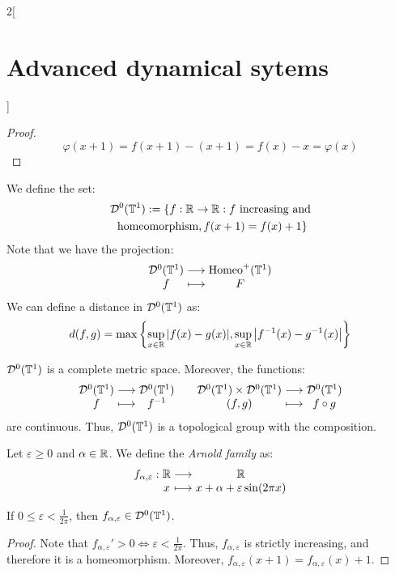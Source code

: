 \documentclass[../../../main_math.tex]{subfiles}
\begin{document}
\begin{multicols}{2}[\section{Advanced dynamical sytems}]
\begin{proof}
    $$
      \varphi(x+1)=f(x+1)-(x+1)=f(x)-x=\varphi(x)
    $$
  \end{proof}
  \begin{definition}
    We define the set:
    \begin{multline*}
      \mathcal{D}^0(\mathbb{T}^1):=\{f:\mathbb{R}\to\mathbb{R}:f\text{ increasing and}\\
      \text{ homeomorphism}, f(x+1)=f(x)+1\}
    \end{multline*}
    Note that we have the projection:
    $$
      \function{}{\mathcal{D}^0(\TT^1)}{\Homeoplus(\TT^1)}{f}{F}
    $$
    We can define a distance in $\mathcal{D}^0(\mathbb{T}^1)$ as:
    $$
      d(f,g)=\max\left\{ \sup_{x\in\mathbb{R}}\abs{f(x)-g(x)},\sup_{x\in\mathbb{R}}\abs{f^{-1}(x)-g^{-1}(x)}\right\}
    $$
  \end{definition}
  \begin{lemma}
    $\mathcal{D}^0(\mathbb{T}^1)$ is a complete metric space. Moreover, the functions:
    $$
      \function{}{\mathcal{D}^0(\TT^1)}{\mathcal{D}^0(\TT^1)}{f}{f^{-1}}\quad
      \function{}{\mathcal{D}^0(\TT^1)\times \mathcal{D}^0(\TT^1)}{\mathcal{D}^0(\TT^1)}{(f,g)}{f\circ g}
    $$
    are continuous.
    Thus, $\mathcal{D}^0(\mathbb{T}^1)$ is a topological group with the composition.
  \end{lemma}
  \begin{definition}
    Let $\varepsilon\geq 0$ and $\alpha\in\mathbb{R}$. We define the \emph{Arnold family} as:
    $$
      \function{f_{\alpha,\varepsilon}}{\RR}{\RR}{x}{x+\alpha+\varepsilon\sin(2\pi x)}
    $$
  \end{definition}
  \begin{lemma}
    If $0\leq \varepsilon<\frac{1}{2\pi}$, then $f_{\alpha,\varepsilon}\in \mathcal{D}^0(\mathbb{T}^1)$.
  \end{lemma}
  \begin{proof}
    Note that ${f_{\alpha,\varepsilon}}'>0\iff \varepsilon<\frac{1}{2\pi}$. Thus, $f_{\alpha,\varepsilon}$ is strictly increasing, and therefore it is a homeomorphism. Moreover, $f_{\alpha,\varepsilon}(x+1)=f_{\alpha,\varepsilon}(x)+1$.
  \end{proof}

\end{multicols}
\end{document}
